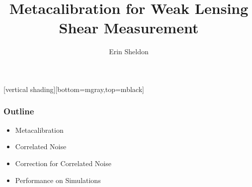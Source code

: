 \documentclass{beamer}
\title{Metacalibration for Weak Lensing Shear Measurement}
\author{Erin Sheldon}
\institute{Brookhaven National Laboratory\\LSST DESC Meeting at SLAC}
\begin{document}
\frame{\titlepage}


[vertical shading][bottom=mgray,top=mblack]

\frame
{
    \frametitle{Outline}

 
    \begin{itemize}

        \item Metacalibration

        \item Correlated Noise

        \item Correction for Correlated Noise

        \item Performance on Simulations

    \end{itemize}

}
\end{document}
